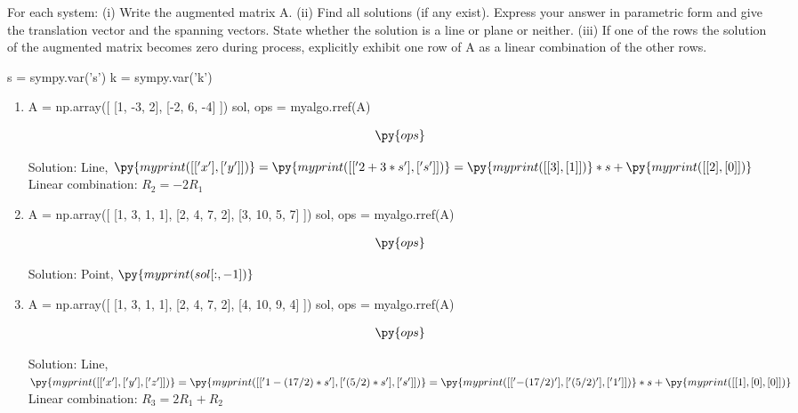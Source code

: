 \documentclass[letter]{article}
\newenvironment{question}[2][Question]{\begin{trivlist}
\item[\hskip \labelsep {\bfseries #1}\hskip \labelsep {\bfseries #2.}]}{\end{trivlist}}
\begin{document}
\begin{question}{1.55}
For each system: (i) Write the augmented matrix A. (ii) Find all solutions (if any exist). 
Express your answer in parametric form and give the translation vector and the spanning 
vectors. State whether the solution is a line or plane or neither. (iii) If one of the rows 
the solution of the augmented matrix becomes zero during process, explicitly exhibit one row 
of A as a linear combination of the other rows.

\begin{pycode}
s = sympy.var('s')
k = sympy.var('k')
\end{pycode}


\begin{enumerate}[label=\alph*]
  \item
\begin{pycode}
A = np.array([
  [1, -3, 2],
  [-2, 6, -4]
])
sol, ops = myalgo.rref(A)
  \end{pycode}
  \begin{align*}
    \py{ops}
  \end{align*}

  Solution: Line, $
  \py{myprint([['x'], ['y']])} 
  = \py{myprint([['2 + 3*s'], ['s']])} 
  = \py{myprint([[3], [1]])} * s + \py{myprint([[2], [0]])}
  $ \\
  Linear combination: $R_2 = -2R_1$

  \item \begin{pycode}
A = np.array([
  [1, 3, 1, 1],
  [2, 4, 7, 2],
  [3, 10, 5, 7]
])
sol, ops = myalgo.rref(A)
  \end{pycode}
  \begin{align*}
    \py{ops}
  \end{align*}

  Solution: Point, $\py{myprint(sol[:, -1])}$ 

  \item \begin{pycode}
A = np.array([
  [1, 3, 1, 1],
  [2, 4, 7, 2],
  [4, 10, 9, 4]
])
sol, ops = myalgo.rref(A)
  \end{pycode}
  \begin{align*}
    \py{ops}
  \end{align*}

  Solution: Line, $
  \py{myprint([['x'], ['y'], ['z']])} 
  = \py{myprint([['1-(17/2)*s'], ['(5/2)*s'], ['s']])} 
  = \py{myprint([['-(17/2)'], ['(5/2)'], ['1']])} * s + \py{myprint([[1], [0], [0]])}
  $ \\
  Linear combination: $R_3 = 2R_1 + R_2$


\end{enumerate}
\end{question}
\end{document}
